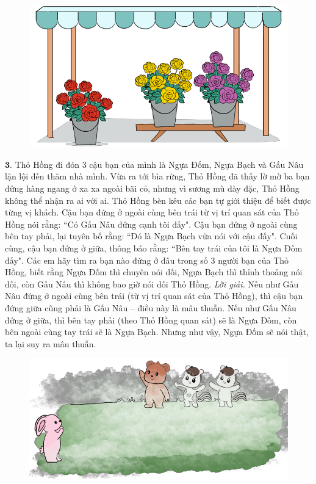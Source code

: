 \begin{multicols}{2}
	\begin{figure}[H]
		\centering
		\vspace*{-5pt}
		\captionsetup{labelformat= empty, justification=centering}
		\includegraphics[width=1\linewidth]{Pi9_bai2}
		\vspace*{-15pt}
	\end{figure}
	$\pmb{3.}$ Thỏ Hồng đi đón $3$ cậu bạn của mình là Ngựa Đốm, Ngựa Bạch và Gấu Nâu lặn lội đến thăm nhà mình. Vừa ra tới bìa rừng, Thỏ Hồng đã thấy lờ mờ ba bạn đứng hàng ngang ở xa xa ngoài bãi cỏ, nhưng vì sương mù dày đặc, Thỏ Hồng không thể nhận ra ai với ai. Thỏ Hồng bèn kêu các bạn tự giới thiệu để biết được từng vị khách. Cậu bạn đứng ở ngoài cùng bên trái từ vị trí quan sát của Thỏ Hồng nói rằng: ``Có Gấu Nâu đứng cạnh tôi đấy". Cậu bạn đứng ở ngoài cùng bên tay phải, lại tuyên bố rằng: ``Đó là Ngựa Bạch vừa nói với cậu đấy". Cuối cùng, cậu bạn đứng ở giữa, thông báo rằng: ``Bên tay trái của tôi là Ngựa Đốm đấy". Các em hãy tìm ra bạn nào đứng ở đâu trong số $3$ người bạn của Thỏ Hồng, biết rằng Ngựa Đốm thì chuyên nói dối, Ngựa Bạch thì thỉnh thoảng nói dối, còn Gấu Nâu thì không bao giờ nói dối Thỏ Hồng.
	\vskip 0.1cm
	\textit{Lời giải.} Nếu như Gấu Nâu đứng ở ngoài cùng bên trái (từ vị trí quan sát của Thỏ Hồng), thì cậu bạn đứng giữa cũng phải là Gấu Nâu -- điều này là mâu thuẫn. Nếu như Gấu Nâu đứng ở giữa, thì bên tay phải (theo Thỏ Hồng quan sát) sẽ là Ngựa Đốm, còn bên ngoài cùng tay trái sẽ là Ngựa Bạch. Nhưng như vậy, Ngựa Đốm sẽ nói thật, ta lại suy ra mâu thuẫn.
	\begin{figure}[H]
		\centering
		\vspace*{-5pt}
		\captionsetup{labelformat= empty, justification=centering}
		\includegraphics[width=1\linewidth]{Pi9_bai3}

\end{figure}
\end{multicols}
